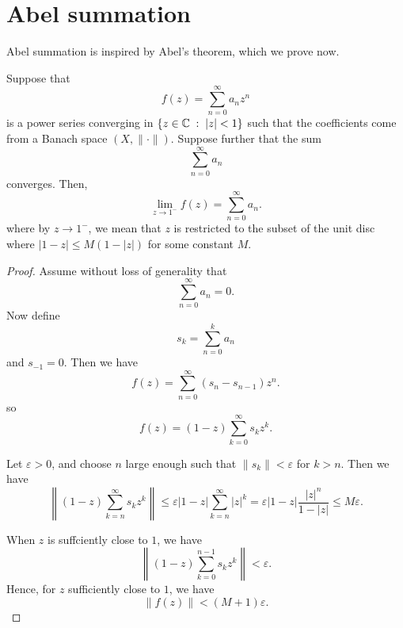 \section{Abel summation}
Abel summation is inspired by Abel's theorem, which we prove now.
\begin{proposition}
    Suppose that
    \begin{equation*}
        f(z) = \sum_{n=0}^\infty a_n z^n
    \end{equation*}
    is a power series converging in $\{z \in \mathbb{C}\;:\;|z| < 1\}$
    such that the coefficients come from a Banach space $(X,\|\cdot\|)$. Suppose further that the sum
    \begin{equation*}
        \sum_{n=0}^\infty a_n
    \end{equation*}
    converges. Then,
    \begin{equation*}
        \lim_{z\rightarrow 1^-} f(z) = \sum_{n=0}^\infty a_n.
    \end{equation*}
    where by $z\rightarrow 1^-$, we mean that $z$ is restricted
    to the subset of the unit disc where $|1-z| \leq M(1-|z|)$
    for some constant $M$.
\end{proposition}
\begin{proof}
    Assume without loss of generality that 
    \begin{equation*}
        \sum_{n=0}^\infty a_n = 0.
    \end{equation*}
    Now define
    \begin{equation*}
        s_k = \sum_{n=0}^k a_n
    \end{equation*}
    and $s_{-1} = 0$.
    Then we have
    \begin{equation*}
        f(z) = \sum_{n=0}^\infty (s_n-s_{n-1})z^n.
    \end{equation*}
    so
    \begin{equation*}
        f(z) = (1-z)\sum_{k=0}^\infty s_k z^k.
    \end{equation*}
    
    Let $\varepsilon > 0$, and choose $n$ large enough such that $\|s_k\| < \varepsilon$
    for $k > n$. Then we have
    \begin{equation*}
        \left\|(1-z)\sum_{k=n}^\infty s_k z^k\right\| \leq \varepsilon|1-z|\sum_{k=n}^\infty |z|^k = \varepsilon|1-z| \frac{|z|^n}{1-|z|} \leq M \varepsilon.
    \end{equation*}
    
    When $z$ is suffciently close to $1$, we have
    \begin{equation*}
        \left\|(1-z)\sum_{k=0}^{n-1} s_k z^k\right\| < \varepsilon.
    \end{equation*}
    Hence, for $z$ sufficiently close to $1$, we have
    \begin{equation*}
        \|f(z)\| < (M+1)\varepsilon.
    \end{equation*}
\end{proof}
